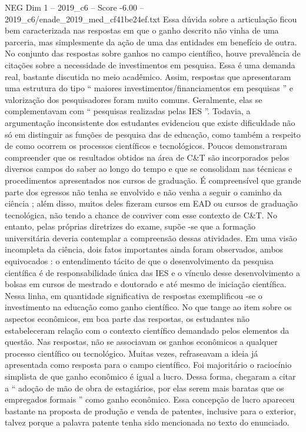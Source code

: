 \begin{textsample}{NEG Dim 1 – 2019\_c6 – Score -6.00 – 2019\_c6/enade\_2019\_med\_cf41be24ef.txt}
Essa dúvida sobre a articulação ficou bem caracterizada nas respostas em que o ganho descrito não vinha de uma parceria, mas simplesmente da ação de uma das entidades em benefício de outra.
No conjunto das respostas sobre ganhos no campo científico, houve prevalência de citações sobre a necessidade de investimentos em pesquisa.
Essa é uma demanda real, bastante discutida no meio acadêmico.
Assim, respostas que apresentaram uma estrutura do tipo “ maiores investimentos/financiamentos em pesquisas ” e valorização dos pesquisadores foram muito comuns.
Geralmente, elas se complementavam com “ pesquisas realizadas pelas IES ”.
Todavia, a argumentação inconsistente dos estudantes evidenciou que existe dificuldade não só em distinguir as funções de pesquisa das de educação, como também a respeito de como ocorrem os processos científicos e tecnológicos.
Poucos demonstraram compreender que os resultados obtidos na área de C\&T são incorporados pelos diversos campos do saber ao longo do tempo e que se consolidam nas técnicas e procedimentos apresentados nos cursos de graduação.
É compreensível que grande parte dos egressos não tenha se envolvido e não venha a seguir o caminho da ciência ; além disso, muitos deles fizeram cursos em EAD ou cursos de graduação tecnológica, não tendo a chance de conviver com esse contexto de C\&T.
No entanto, pelas próprias diretrizes do exame, supõe -se que a formação universitária deveria contemplar a compreensão dessas atividades.
Em uma visão incompleta da ciência, dois fatos importantes ainda foram observados, ambos equivocados : o entendimento tácito de que o desenvolvimento da pesquisa científica é de responsabilidade única das IES e o vínculo desse desenvolvimento a bolsas em cursos de mestrado e doutorado e até mesmo de iniciação científica.
Nessa linha, em quantidade significativa de respostas exemplificou -se o investimento na educação como ganho científico.
No que tange ao item sobre os aspectos econômicos, em boa parte das respostas, os estudantes não estabeleceram relação com o contexto científico demandado pelos elementos da questão.
Nas respostas, não se associavam os ganhos econômicos a qualquer processo científico ou tecnológico.
Muitas vezes, refraseavam a ideia já apresentada como resposta para o campo científico.
Foi majoritário o raciocínio simplista de que ganho econômico é igual a lucro.
Dessa forma, chegaram a citar a “ adoção de mão de obra de estagiários, por elas serem mais baratas que os empregados formais ” como ganho econômico.
Essa concepção de lucro apareceu bastante na proposta de produção e venda de patentes, inclusive para o exterior, talvez porque a palavra patente tenha sido mencionada no texto do enunciado.

\end{textsample}
